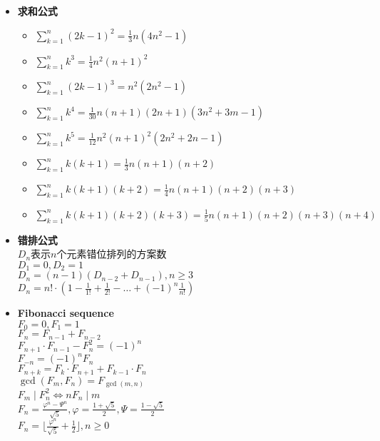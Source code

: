 \begin{itemize}
    \item \textbf{求和公式}
        \begin{itemize}
            \item $ \sum\limits_{k=1}^{n} (2k - 1)^2 = \frac{1}{3} n(4n^2 - 1) $
            \item $ \sum\limits_{k=1}^{n} k^3 = \frac{1}{4} n^2(n + 1)^2 $
            \item $ \sum\limits_{k=1}^{n} (2k - 1)^3 = n^2(2n^2 - 1) $
            \item $ \sum\limits_{k=1}^{n} k^4 = \frac{1}{30} n(n + 1) (2n + 1) (3n^2 + 3m - 1) $
            \item $ \sum\limits_{k=1}^{n} k^5 = \frac{1}{12} n^2(n + 1)^2(2n^2 + 2n - 1) $
            \item $ \sum\limits_{k=1}^{n} k(k + 1) = \frac{1}{3} n(n + 1)(n + 2) $
            \item $ \sum\limits_{k=1}^{n} k(k + 1)(k + 2) = \frac{1}{4} n(n + 1)(n + 2)(n + 3) $
            \item $ \sum\limits_{k=1}^{n} k(k + 1)(k + 2)(k + 3) = \frac{1}{5} n(n + 1)(n + 2)(n + 3)(n + 4) $
        \end{itemize}
    \item \textbf{错排公式}
        \\$ D_n $表示$ n $个元素错位排列的方案数
        \\$ D_1 = 0, D_2 = 1 $
        \\$ D_n = (n - 1)(D_{n - 2} + D_{n - 1}), n \geq 3 $
        \\$ D_n = n! \cdot (1 - \frac{1}{1!} + \frac{1}{2!} - \dots + (-1)^n\frac{1}{n!}) $
    \item \textbf{Fibonacci sequence}
        \\$ F_0 = 0, F_1 = 1 $
        \\$ F_n = F_{n - 1} + F_{n - 2} $
        \\$ F_{n + 1} \cdot F_{n - 1} - F_{n}^2 = (-1)^n $
        \\$ F_{-n} = (-1)^n F_n $
        \\$ F_{n + k} = F_k \cdot F_{n + 1} + F_{k - 1} \cdot F_n $
        \\$ \gcd(F_m, F_n) = F_{\gcd(m, n)} $
        \\$ F_m \mid F_n^2 \Leftrightarrow nF_n \mid m $
        \\$ F_n = \frac{\varphi^n - \varPsi^n}{\sqrt{5}}, \varphi = \frac{1 + \sqrt{5}}{2}, \varPsi = \frac{1 - \sqrt{5}}{2} $
        \\$ F_n = \lfloor \frac{\varphi^n}{\sqrt{5}} + \frac{1}{2} \rfloor, n \geq 0 $

\end{itemize}
